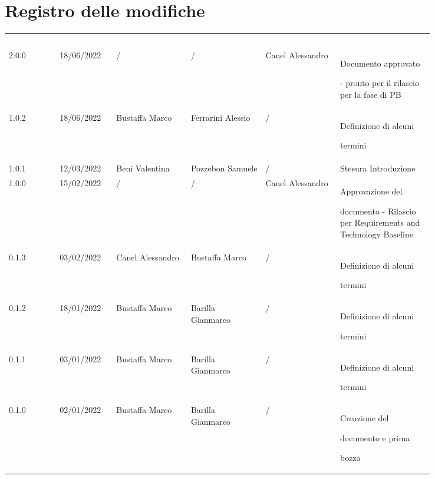 \section*{Registro delle modifiche}

{\renewcommand{\arraystretch}{1.5}
\scriptsize
\begin{tabular}{p{0.10\linewidth}p{0.10\linewidth}p{0.15\linewidth}p{0.15\linewidth}p{0.15\linewidth}p{0.19\linewidth}}
	\rowcolor[RGB]{33, 73, 50}
	\textcolor{white}{\textbf{Versione}} & \textcolor{white}{\textbf{Data}} &
	\textcolor{white}{\textbf{Redattore}} & \textcolor{white}{\textbf{Verificatore}} &
	\textcolor{white}{\textbf{Approvatore}} & \textcolor{white}{\textbf{Descrizione}}\\
	
	\rowcolor[RGB]{233, 245, 206}
	2.0.0 & 18/06/2022 & / & / & Canel Alessandro & Documento approvato \par - pronto per il rilascio per la fase di PB\\
	\rowcolor[RGB]{216, 235, 171}
	1.0.2 & 18/06/2022 & Bustaffa Marco & Ferrarini Alessio & / & Definizione di alcuni \par termini \\
	\rowcolor[RGB]{233, 245, 206}
	1.0.1 & 12/03/2022 & Beni Valentina & Pozzebon Samuele & / & Stesura Introduzione\\
	\rowcolor[RGB]{216, 235, 171}
	1.0.0 & 15/02/2022 & / & / & Canel Alessandro& Approvazione del \par documento - Rilascio per Requirements and Technology Baseline\\
	\rowcolor[RGB]{233, 245, 206}
	0.1.3 & 03/02/2022 & Canel Alessandro & Bustaffa Marco &/& Definizione di alcuni \par termini\\
	\rowcolor[RGB]{216, 235, 171}
	0.1.2 & 18/01/2022 & Bustaffa Marco & Barilla Gianmarco &/& Definizione di alcuni \par termini\\
	\rowcolor[RGB]{233, 245, 206}
	0.1.1 & 03/01/2022 & Bustaffa Marco & Barilla Gianmarco &/& Definizione di alcuni \par termini\\
	\rowcolor[RGB]{216, 235, 171}
	0.1.0 & 02/01/2022 & Bustaffa Marco & Barilla Gianmarco &/& Creazione del \par documento  e prima \par bozza\\
\end{tabular}
}

